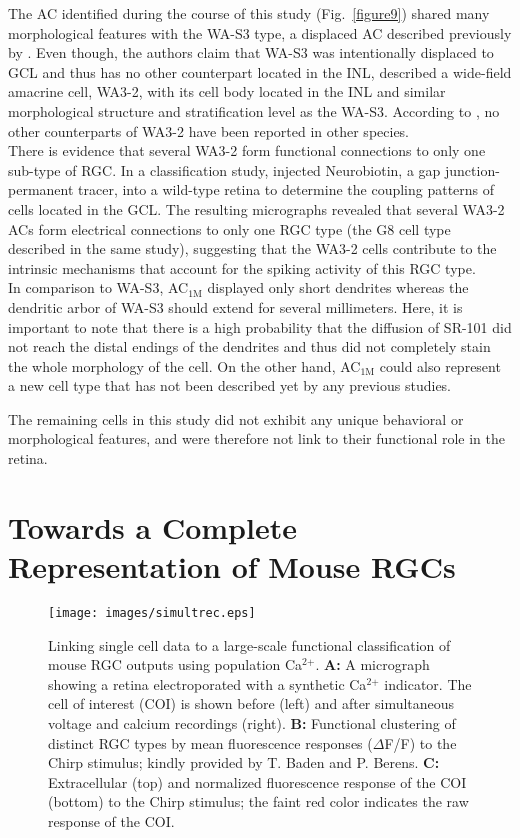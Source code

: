 The AC identified during the course of this study (Fig.~\ref{figure9}) shared many morphological features with the WA-S3 type, a displaced AC described previously by \citet{sevilla07}. Even though, the authors claim that WA-S3 was intentionally displaced to GCL and thus has no other counterpart located in the INL, \citet{lin06} described a wide-field amacrine cell, WA3-2, with its cell body located in the INL and similar morphological structure and stratification level as the WA-S3. According to \citet{lin06}, no other counterparts of WA3-2 have been reported in other species.\\
There is evidence that several WA3-2 form functional connections to only one sub-type of RGC. In a classification study, \citet{voelgyi09} injected Neurobiotin, a gap junction-permanent tracer, into a wild-type retina to determine the coupling patterns of cells located in the GCL. The resulting micrographs revealed that several WA3-2 ACs form electrical connections to only one RGC type (the G8 cell type described in the same study), suggesting that the WA3-2 cells contribute to the intrinsic mechanisms that account for the spiking activity of this RGC type.\\
In comparison to WA-S3, AC$_{\text{1M}}$ displayed only short dendrites whereas the dendritic arbor of WA-S3 should extend for several millimeters. Here, it is important to note that there is a high probability that the diffusion of SR-101 did not reach the distal endings of the dendrites and thus did not completely stain the whole morphology of the cell. On the other hand, AC$_{\text{1M}}$ could also represent a new cell type that has not been described yet by any previous studies. 

The remaining cells in this study did not exhibit any unique behavioral or morphological features, and were therefore not link to their functional role in the retina.

\section{Towards a Complete Representation of Mouse RGCs}

\begin{figure}[t]
\begin{center}
\texttt{[image: images/simultrec.eps]}
\caption{Linking single cell data to a large-scale functional classification of mouse RGC outputs using population Ca$^{\text{2+}}$. \textbf{A:} A micrograph showing a retina electroporated with a synthetic Ca$^{\text{2+}}$ indicator. The cell of interest (COI) is shown before (left) and after simultaneous voltage and calcium recordings (right). \textbf{B:} Functional clustering of distinct RGC types by mean fluorescence responses ($\Delta$F/F) to the Chirp stimulus; kindly provided by T. Baden and P. Berens. \textbf{C:} Extracellular (top) and normalized fluorescence response of the COI (bottom) to the Chirp stimulus; the faint red color indicates the raw response of the COI.}
\label{figure10}
\end{center}
\end{figure}

